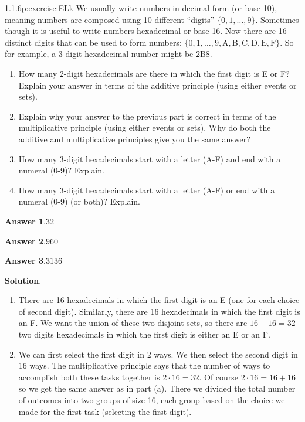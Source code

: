 \documentclass[twoside,11pt,]{book}
\newcommand{\blocktitlefont}{\relax}
\numberwithin{equation}{chapter}
\begin{document}
\begin{divisionsolution}{1.1.6}{}{p:exercise:ELk}%
We usually write numbers in decimal form (or base 10), meaning numbers are composed using 10 different ``digits'' \(\{0,1,\ldots, 9\}\text{.}\) Sometimes though it is useful to write numbers hexadecimal or base 16. Now there are 16 distinct digits that can be used to form numbers: \(\{0, 1, \ldots, 9, \mathrm{A, B, C, D, E, F}\}\text{.}\) So for example, a 3 digit hexadecimal number might be 2B8.%
\begin{enumerate}[label=(\alph*)]
\item{}How many 2-digit hexadecimals are there in which the first digit is E or F? Explain your answer in terms of the additive principle (using either events or sets).%
\item{}Explain why your answer to the previous part is correct in terms of the multiplicative principle (using either events or sets). Why do both the additive and multiplicative principles give you the same answer?%
\item{}How many 3-digit hexadecimals start with a letter (A-F) and end with a numeral (0-9)? Explain.%
\item{}How many 3-digit hexadecimals start with a letter (A-F) or end with a numeral (0-9) (or both)? Explain.%
\end{enumerate}
%
\par\smallskip%
\noindent\textbf{\blocktitlefont Answer 1}.\quad{}\(32\)%
\par\smallskip%
\noindent\textbf{\blocktitlefont Answer 2}.\quad{}\(960\)%
\par\smallskip%
\noindent\textbf{\blocktitlefont Answer 3}.\quad{}\(3136\)%
\par\smallskip%
\noindent\textbf{\blocktitlefont Solution}.\quad{}%
\begin{enumerate}[label=(\alph*)]
\item{}There are 16 hexadecimals in which the first digit is an E (one for each choice of second digit). Similarly, there are 16 hexadecimals in which the first digit is an F. We want the union of these two disjoint sets, so there are \(16 + 16 = 32\) two digits hexadecimals in which the first digit is either an E or an F.%
\item{}We can first select the first digit in 2 ways. We then select the second digit in 16 ways. The multiplicative principle says that the number of ways to accomplish both these tasks together is \(2 \cdot 16 = 32\text{.}\) Of course \(2 \cdot 16 = 16 + 16\) so we get the same answer as in part (a). There we divided the total number of outcomes into two groups of size 16, each group based on the choice we made for the first task (selecting the first digit).%

\end{enumerate}
\end{divisionsolution}
\end{document}
